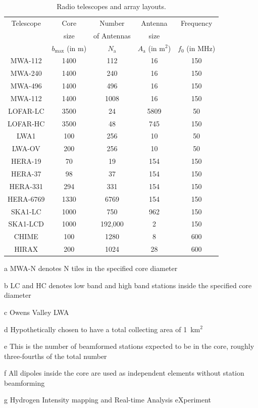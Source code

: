 \documentclass[a4paper,fleqn,usenatbib]{mnras}
\newcommand{\Nant}{N_\textrm{a}}
\begin{document}
\begin{table}
  \scriptsize
  \centering
  \caption{Radio telescopes and array layouts.}
  \label{tab:antenna-layouts}
  \begin{threeparttable}
  \begin{tabular}{ccccc} 
    \hline
    Telescope & Core & Number & Antenna & Frequency \\
              & size & of Antennas & size & \\
              & $b_\textrm{max}$ (in m) & $\Nant$ & $A_\textrm{a}$ (in m$^2$) & $f_0$ (in MHz) \\
    \hline
    MWA-112\tnote{a} & 1400 & 112 & 16 & 150 \\
    MWA-240\tnote{a} & 1400 & 240 & 16 & 150 \\
    MWA-496\tnote{a} & 1400 & 496 & 16 & 150 \\
    MWA-112\tnote{a} & 1400 & 1008 & 16 & 150 \\
    LOFAR-LC\tnote{b} & 3500 & 24 & 5809 & 50 \\
    LOFAR-HC\tnote{b} & 3500 & 48 & 745 & 150 \\
    LWA1 & 100 & 256 & 10 & 50 \\
    LWA-OV\tnote{c} & 200 & 256 & 10 & 50 \\
    HERA-19 & 70 & 19 & 154 & 150 \\
    HERA-37 & 98 & 37 & 154 & 150 \\
    HERA-331 & 294 & 331 & 154 & 150 \\
    HERA-6769\tnote{d} & 1330 & 6769 & 154 & 150 \\
    SKA1-LC\tnote{e} & 1000 & 750 & 962 & 150 \\
    SKA1-LCD\tnote{f} & 1000 & 192,000 & 2 & 150 \\
    CHIME & 100 & 1280 & 8 & 600 \\
    HIRAX\tnote{g} & 200 & 1024 & 28 & 600 \\
    \hline
  \end{tabular}
  \begin{tablenotes}
    \item[a] MWA-N denotes N tiles in the specified core diameter
    \item[b] LC and HC denotes low band and high band stations inside the 
      specified core diameter 
    \item[c] Owens Valley LWA
    \item[d] Hypothetically chosen to have a total collecting area of 
      1~km$^2$
    \item[e] This is the number of beamformed stations expected to be in the 
      core, roughly three-fourths of the total number
    \item[f] All dipoles inside the core are used as independent elements 
      without station beamforming
    \item[g] Hydrogen Intensity mapping and Real-time Analysis eXperiment
  \end{tablenotes}
  \end{threeparttable}
\end{table}
\end{document}
